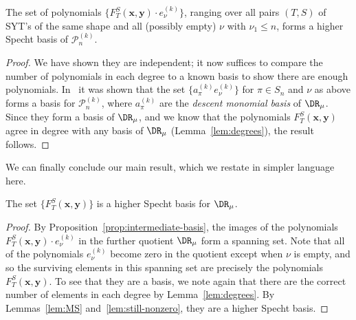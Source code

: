 \begin{prop}\label{prop:intermediate-basis}
	The set of polynomials $\{F_T^S(\mathbf{x},\mathbf{y})\cdot e_\nu^{(k)}\}$, ranging over all pairs $(T,S)$ of SYT's of the same shape and all (possibly empty) $\nu$ with $\nu_1\le n$, forms a higher Specht basis of $\mathcal{P}_n^{(k)}$.
\end{prop}

\begin{proof}
	We have shown they are independent; it now suffices to compare the number of polynomials in each degree to a known basis to show there are enough polynomials.  In~\cite{HookBases} it was shown that the set $\{a_\pi^{(k)}e_\nu^{(k)}\}$ for $\pi\in S_n$ and $\nu$ as above forms a basis for $\mathcal{P}_n^{(k)}$, where  $a_\pi^{(k)}$ are the \textit{descent monomial basis} of $\DR_\mu$.  Since they form a basis of $\DR_\mu$, and we know that the polynomials $F_T^S(\mathbf{x},\mathbf{y})$ agree in degree with any basis of $\DR_\mu$ (Lemma~\ref{lem:degrees}), the result follows.
\end{proof}

We can finally conclude our main result, which we restate in simpler language here. 

\begin{MainTheorem}
	The set $\{F_T^S(\mathbf{x},\mathbf{y})\}$ is a higher Specht basis for $\DR_\mu$.
\end{MainTheorem}

\begin{proof}
	By Proposition~\ref{prop:intermediate-basis}, the images of the polynomials $F_T^S(\mathbf{x},\mathbf{y})\cdot e_\nu^{(k)}$ in the further quotient $\DR_\mu$ form a spanning set. 
	Note that all of the polynomials $e_\nu^{(k)}$ become zero in the quotient except when $\nu$ is empty, and so the surviving elements in this spanning set are precisely the polynomials $F_T^S(\mathbf{x},\mathbf{y})$.  To see that they are a basis, we note again that there are the correct number of elements in each degree by Lemma~\ref{lem:degrees}.  By Lemmas~\ref{lem:MS} and~\ref{lem:still-nonzero}, they are a higher Specht basis. 
\end{proof}



